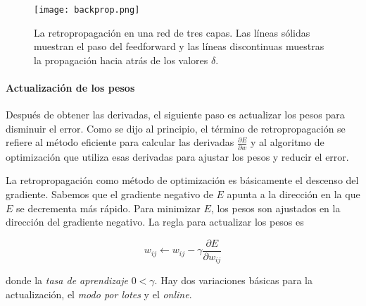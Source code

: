 



\begin{figure}
    \centering
    \texttt{[image: backprop.png]}
    \caption{La retropropagación en una red de tres capas. Las líneas sólidas muestran el paso
    del feedforward y las líneas discontinuas muestras la propagación hacia atrás de los valores $\delta$.}
    \label{fig:backprop}
\end{figure}
\paragraph{Actualización de los pesos}
Después de obtener las derivadas, el siguiente paso es actualizar los pesos
para disminuir el error. Como se dijo al principio, el término 
de retropropagación se refiere al método eficiente para calcular las 
derivadas $\frac{\partial E}{\partial w}$ y al algoritmo de optimización
que utiliza esas derivadas para ajustar los pesos y reducir el error.

La retropropagación como método de optimización es básicamente el 
descenso del gradiente. Sabemos que el gradiente negativo de $E$ apunta a la
dirección en la que $E$ se decrementa más rápido. Para minimizar $E$,
los pesos son ajustados en la dirección del gradiente negativo. La regla para
actualizar los pesos es

\[
w_{ij} \leftarrow  w_{ij} - \gamma \frac{\partial E}{\partial w_{ij}}
\]

donde la \textit{tasa de aprendizaje} $0 < \gamma$.
Hay dos variaciones básicas para la actualización, el \textit{modo por lotes} y 
el \textit{online}.

